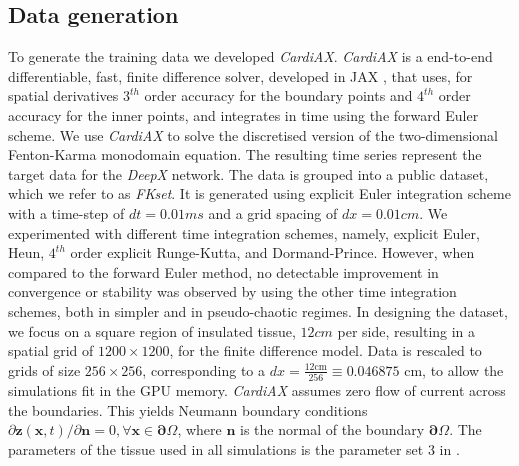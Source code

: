 \documentclass[utf8]{frontiersSCNS} %
\begin{document}
\subsection{Data generation}
\label{sec:methods:data_generation}
To generate the training data we developed \textit{CardiAX}. \textit{CardiAX} is a end-to-end differentiable, fast, finite difference solver, developed in JAX \cite[]{jax2018github}, that uses, for spatial derivatives $3^{th}$ order accuracy for the boundary points and $4^{th}$ order accuracy for the inner points, and integrates in time using the forward Euler scheme.
%
We use \textit{CardiAX} to solve the discretised version of the two-dimensional Fenton-Karma monodomain equation. The resulting time series represent the target data for the \textit{DeepX} network.
%
The data is grouped into a public dataset, which we refer to as \textit{FKset}. It is generated using explicit Euler integration scheme with a time-step of $dt=0.01ms$ and a grid spacing of $dx=0.01cm$. We experimented with different time integration schemes, namely, explicit Euler, Heun, $4^{th}$ order explicit Runge-Kutta, and Dormand-Prince. However, when compared to the forward Euler method, no detectable improvement in convergence or stability was observed by using the other time integration schemes, both in simpler and in pseudo-chaotic regimes.
In designing the dataset, we focus on a square region of insulated tissue, $12cm$ per side, resulting in a spatial grid of $1200 \times 1200$, for the finite difference model.
Data is rescaled to grids of size $256 \times 256$, corresponding to a $dx = \frac{12 \text{cm}}{ 256} \equiv 0.046875$ cm, to allow the simulations fit in the GPU memory.
\textit{CardiAX} assumes zero flow of current across the boundaries. This yields Neumann boundary conditions $\partial \mathbf{z}(\mathbf{x},t)/ \partial \mathbf{n} = 0, \forall \mathbf{x} \in \boldsymbol{\partial}\Omega $, where $ \mathbf{n}$ is the normal of the boundary $\boldsymbol{\partial}\Omega$. The parameters of the tissue used in all simulations is the parameter set 3 in \cite{Fenton2002}.
\end{document}

